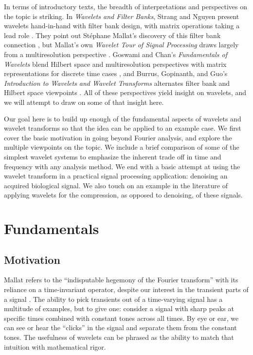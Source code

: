 \documentclass[letterpaper]{article}
\begin{document}
In terms of introductory texts, the breadth of interpretations and perspectives on the topic is striking.
In \emph{Wavelets and Filter Banks}, Strang and Nguyen present wavelets hand-in-hand with filter bank design, with matrix operations taking a lead role \cite{strang}.
They point out St\'{e}phane Mallat's discovery of this filter bank connection \cite[p.~33]{strang}, but
Mallat's own \emph{Wavelet Tour of Signal Processing} draws largely from a multiresolution perspective \cite{mallat}.
Goswami and Chan's \emph{Fundamentals of Wavelets} blend Hilbert space and multiresolution perspectives with matrix representations for discrete time cases \cite{goswami},
and Burrus, Gopinanth, and Guo's \emph{Introduction to Wavelets and Wavelet Transforms} alternates filter bank and Hilbert space viewpoints \cite{burrus}.
All of these perspectives yield insight on wavelets, and we will attempt to draw on some of that insight here.

Our goal here is to build up enough of the fundamental aspects of wavelets and wavelet transforms
so that the idea can be applied to an example case.
We first cover the basic motivation in going beyond Fourier analysis,
and explore the multiple viewpoints on the topic.
We include a brief comparison of some of the simplest wavelet systems to emphasize
the inherent trade off in time and frequency with any analysis method.
We end with a basic attempt at using the wavelet transform in a practical signal processing application: denoising an acquired biological signal.
We also touch on an example in the literature of applying wavelets for the compression, as opposed to denoising, of these signals.

\section{Fundamentals}

\subsection{Motivation}

Mallat refers to the ``indisputable hegemony of the Fourier transform'' with its reliance on a time-invariant operator,
despite our interest in the transient parts of a signal \cite[p.~1]{mallat}.
The ability to pick transients out of a time-varying signal has a multitude of examples, but to give one:
consider a signal with sharp peaks at specific times combined with constant tones across all times.
By eye or ear, we can see or hear the ``clicks'' in the signal and separate them from the constant tones.
The usefulness of wavelets can be phrased as the ability to match that intuition with mathematical rigor.
\end{document}
